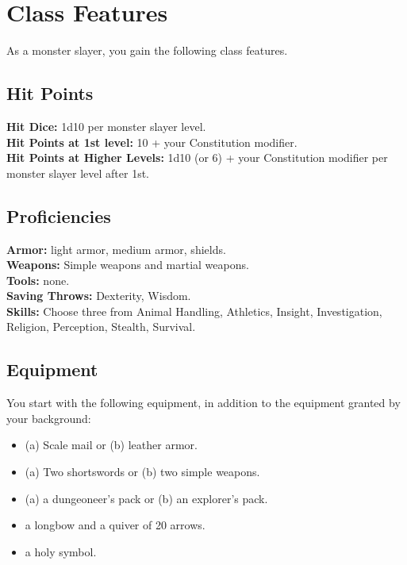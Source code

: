 \documentclass[11pt,a4paper,twocolumn, sans]{article}
\newcommand{\proficiency}[2]
{
	\textbf{#1:} #2. \\
}
\begin{document}
	\section*{Class Features}
	As a monster slayer, you gain the following class features.
	
	\subsection*{Hit Points}
	\proficiency{Hit Dice}{1d10 per monster slayer level}
	\proficiency{Hit Points at 1st level}{10 + your Constitution modifier}
	\proficiency{Hit Points at Higher Levels}{1d10 (or 6) + your Constitution modifier per monster slayer level after 1st}
	
	\subsection*{Proficiencies}
	\proficiency{Armor}{light armor, medium armor, shields}
	\proficiency{Weapons}{Simple weapons and martial weapons}
	\proficiency{Tools}{none}
	\proficiency{Saving Throws}{Dexterity, Wisdom}
	\proficiency{Skills}{Choose three from Animal Handling, Athletics, Insight, Investigation, Religion, Perception, Stealth, Survival}
	
	\subsection*{Equipment}
	You start with the following equipment, in
	addition to the equipment granted by your
	background:
	\begin{itemize}
		\item (a) Scale mail or (b) leather armor.
		\item (a) Two shortswords or (b) two simple weapons.
		\item (a) a dungeoneer's pack or (b) an explorer's pack.
		\item a longbow and a quiver of 20 arrows.
		\item a holy symbol.
	\end{itemize}
	
\end{document}
